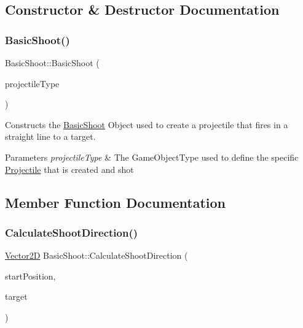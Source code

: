 \subsection{Constructor \& Destructor Documentation}
\mbox{\label{class_basic_shoot_a7594a4b840d698baa8d4a51027078727}} 
\subsubsection{\texorpdfstring{Basic\+Shoot()}{BasicShoot()}}
{\footnotesize\ttfamily Basic\+Shoot\+::\+Basic\+Shoot (\begin{DoxyParamCaption}\item[{Game\+Object\+Type}]{projectile\+Type }\end{DoxyParamCaption})}



Constructs the \hyperlink{class_basic_shoot}{Basic\+Shoot} Object used to create a projectile that fires in a straight line to a target. 


\begin{DoxyParams}{Parameters}
{\em projectile\+Type} & The Game\+Object\+Type used to define the specific \hyperlink{class_projectile}{Projectile} that is created and shot \\
\hline
\end{DoxyParams}


\subsection{Member Function Documentation}
\mbox{\label{class_basic_shoot_aafe1225544d200da3e0c084d33dac60a}} 
\subsubsection{\texorpdfstring{Calculate\+Shoot\+Direction()}{CalculateShootDirection()}}
{\footnotesize\ttfamily \hyperlink{class_vector2_d}{Vector2D} Basic\+Shoot\+::\+Calculate\+Shoot\+Direction (\begin{DoxyParamCaption}\item[{\hyperlink{class_vector2_d}{Vector2D}}]{start\+Position,  }\item[{\hyperlink{class_vector2_d}{Vector2D}}]{target }\end{DoxyParamCaption})\hspace{0.3cm}{\ttfamily [private]}}



